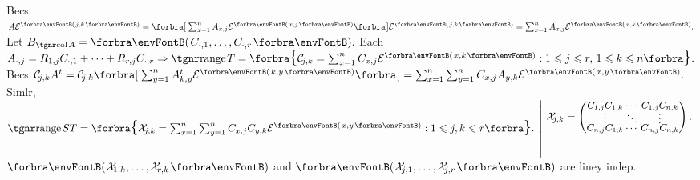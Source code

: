 Becs $A\mEnt{j,k}=\BigSbra{\sum_{x=1}^nA_{x,j}\mEnt{x,j}}\mEnt{j,k}=\sum_{x=1}^nA_{x,j}\mEnt{x,k}.$ \;Let $B_{\col A}=\Par{C_{\cdot,1},\dots,C_{\cdot,r}}.$\vspace{2pt}\parSol{}
Each $A_{\cdot,j}=R_{1,j}C_{\cdot,1}+\dots+R_{r,j}C_{\cdot,r}\Rightarrow\range T=\Bra{\mC_{\!j,k}=\sum_{x=1}^nC_{x,j}\mEnt{x,k}:1\leqslant j\leqslant r,\,1\leqslant k\leqslant n}.$\vspace{3pt}\parSol{}
Becs $\mC_{\!j,k}A^t=\mC_{\!j,k}\BigSbra{\sum_{y=1}^nA^t_{k,y}\mEnt{k,y}}=\sum_{x=1}^n\sum_{y=1}^nC_{x,j}A_{y,k}\mEnt{x,y}.$\vspace{-20pt}\parSol{}
Simlr, $\range ST=\Bra{\mX_{\!j,k}=\sum_{x=1}^n\sum_{y=1}^nC_{x,j}C_{y,k}\mEnt{x,y}:1\leqslant j,k\leqslant r}.\;\hMath{l}{\left|}{\right.}{\;\mX_{\!j,k}=\small\begin{pmatrix}C_{1,j}C_{1,k} &\hspace{-8pt} \cdots &\hspace{-8pt} C_{1,j}C_{n,k}\\[-4pt]
		\vdots &\hspace{-8pt} \ddots &\hspace{-8pt} \vdots\\[-4pt]
		C_{n,j}C_{1,k} &\hspace{-8pt} \cdots &\hspace{-8pt} C_{n,j}C_{n,k}\end{pmatrix}.\\[20pt]\,}$\vspace{-20pt}\parSol{}
$\Par{\mX_{\!1,k},\dots,\mX_{\!r,k}}$ and $\Par{\mX_{\!j,1},\dots,\mX_{\!j,r}}$ are liney indep.\PfEnd
\SepLine
\pagebreak

